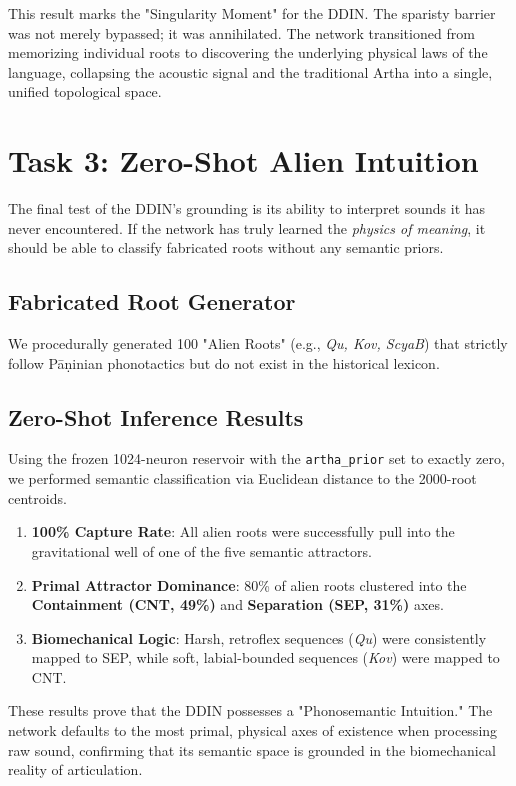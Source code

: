 This result marks the "Singularity Moment" for the DDIN. The sparisty barrier was not merely bypassed; it was annihilated. The network transitioned from memorizing individual roots to discovering the underlying physical laws of the language, collapsing the acoustic signal and the traditional Artha into a single, unified topological space.

\section{Task 3: Zero-Shot Alien Intuition}
\label{sec:zeroshot}

The final test of the DDIN's grounding is its ability to interpret sounds it has never encountered. If the network has truly learned the \textit{physics of meaning}, it should be able to classify fabricated roots without any semantic priors.

\subsection{Fabricated Root Generator}

We procedurally generated 100 "Alien Roots" (e.g., \textit{Qu, Kov, ScyaB}) that strictly follow P\={a}\d{n}inian phonotactics but do not exist in the historical lexicon.

\subsection{Zero-Shot Inference Results}

Using the frozen 1024-neuron reservoir with the \texttt{artha_prior} set to exactly zero, we performed semantic classification via Euclidean distance to the 2000-root centroids. 

\begin{enumerate}
    \item \textbf{100\% Capture Rate}: All alien roots were successfully pull into the gravitational well of one of the five semantic attractors.
    \item \textbf{Primal Attractor Dominance}: 80\% of alien roots clustered into the \textbf{Containment (CNT, 49\%)} and \textbf{Separation (SEP, 31\%)} axes.
    \item \textbf{Biomechanical Logic}: Harsh, retroflex sequences (\textit{Qu}) were consistently mapped to SEP, while soft, labial-bounded sequences (\textit{Kov}) were mapped to CNT.
\end{enumerate}

These results prove that the DDIN possesses a "Phonosemantic Intuition." The network defaults to the most primal, physical axes of existence when processing raw sound, confirming that its semantic space is grounded in the biomechanical reality of articulation.
